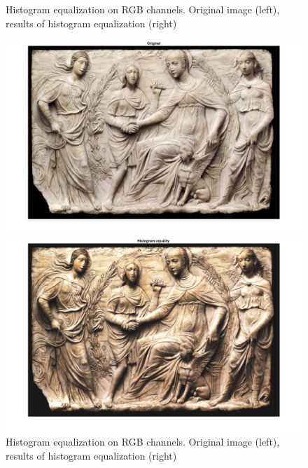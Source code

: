 \documentclass[conference]{IEEEtran}
\begin{document}
\begin{figure}[ht]
\begin{multicols}{2}
    \end{multicols}
\caption{Histogram equalization on RGB channels. Original image (left), results of histogram equalization (right)}
\label{hist_1}
\end{figure}

\begin{figure}[ht]
\begin{multicols}{2}
    \includegraphics[width=\linewidth]{histeq21.png}\par 
    \includegraphics[width=\linewidth]{histeq22.png}\par 
    \end{multicols}
\caption{Histogram equalization on RGB channels. Original image (left), results of histogram equalization (right)}
\label{hist_2}
\end{figure}
\end{document}
